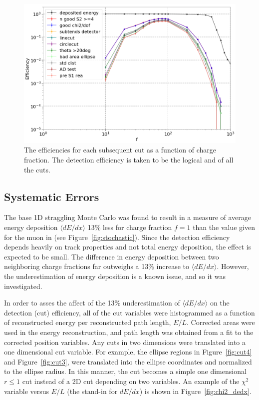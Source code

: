\begin{figure}[htbp]
\begin{center}
\includegraphics[width=\textwidth]{figures/lips/eff.png}
\caption{The efficiencies for each subsequent cut as a function of charge fraction. The detection efficiency is taken to be the logical and of all the cuts.}
\label{fig:eff}
\end{center}
\end{figure}

\FloatBarrier
\subsection{Systematic Errors}
\label{sec:systematics}
The base 1D straggling Monte Carlo was found to result in a measure of average energy deposition $\langle dE/dx \rangle$ 13\% less for charge fraction $f=1$ than the value given for the muon in \cite{PDG} (see Figure~\ref{fig:stochastic}). Since the detection efficiency depends heavily on track properties and not total energy deposition, the effect is expected to be small. The difference in energy deposition between two neighboring charge fractions far outweighs a 13\% increase to $\langle dE/dx \rangle$. However, the underestimation of energy deposition is a known issue, and so it was investigated. 

In order to asses the affect of the 13\% underestimation of $\langle dE/dx \rangle$ on the detection (cut) efficiency, all of the cut variables were histogrammed as a function of reconstructed energy per reconstructed path length, $E/L$. Corrected areas were used in the energy reconstruction, and path length was obtained from a fit to the corrected position variables. Any cuts in two dimensions were translated into a one dimensional cut variable. For example, the ellipse regions in Figure~\ref{fig:cut4} and Figure~\ref{fig:cut3}, were translated into the ellipse coordinates and normalized to the ellipse radius. In this manner, the cut becomes a simple one dimensional $r \leqslant 1$ cut instead of a 2D cut depending on two variables. An example of the $\chi^{2}$ variable versus $E/L$ (the stand-in for $dE/dx$) is shown in Figure~\ref{fig:chi2_dedx}. 

